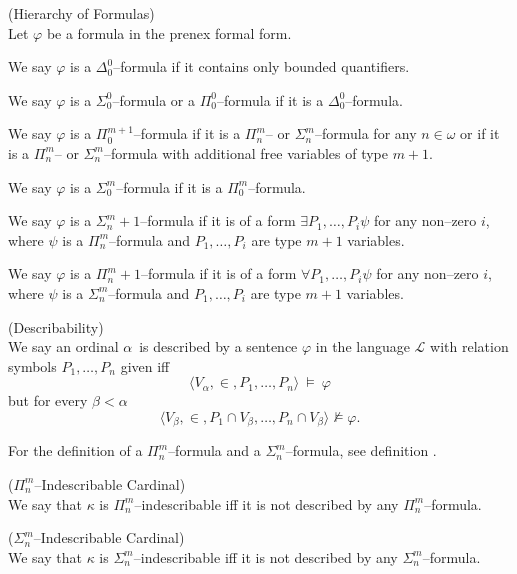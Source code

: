 \begin{definition}{(Hierarchy of Formulas)}\label{def:analytical_hierarchy}\\
Let $\varphi$ be a formula in the prenex formal form.
\bce[(i)]
\item We say $\varphi$ is a $\Delta^0_0$–formula if it contains only bounded quantifiers.
\item We say $\varphi$ is a $\Sigma^0_0$–formula or a $\Pi^0_0$–formula if it is a $\Delta^0_0$–formula.
\item We say $\varphi$ is a $\Pi^{m+1}_0$–formula if it is a $\Pi^m_n$– or $\Sigma^m_n$–formula for any $n \in \omega$ or if it is a $\Pi^m_n$– or $\Sigma^m_n$–formula with additional free variables of type $m+1$.
\item We say $\varphi$ is a $\Sigma^m_0$–formula if it is a $\Pi^m_0$–formula.
\item We say $\varphi$ is a $\Sigma^m_n+1$–formula if it is of a form $\exists P_1, \ldots, P_i \psi$ for any non–zero $i$, where $\psi$ is a $\Pi^m_n$–formula and $P_1, \ldots, P_i$ are type $m+1$ variables.
\item We say $\varphi$ is a $\Pi^m_n+1$–formula if it is of a form $\forall P_1, \ldots, P_i \psi$ for any non–zero $i$, where $\psi$ is a $\Sigma^m_n$–formula and $P_1, \ldots, P_i$ are type $m+1$ variables.
\ece
\end{definition}


\begin{definition}{(Describability)}\label{def:describability}\\
We say an ordinal $\alpha$ is described by a sentence $\varphi$ in the language $\mathscr{L}$ with relation symbols $P_1, \ldots, P_n$ given iff
\begin{equation}
\langle V_\alpha, \in, P_1, \ldots, P_n \rangle~\models~\varphi
\end{equation}
but for every $\beta < \alpha$
\begin{equation}
\langle V_\beta, \in, P_1 \cap V_\beta, \ldots, P_n \cap V_\beta \rangle \not\models \varphi\mbox{.}
\end{equation}
\end{definition}

For the definition of a $\Pi^m_n$–formula and a $\Sigma^m_n$–formula, see definition .

\begin{definition}{($\Pi^m_n$–Indescribable Cardinal)}\label{def:pi_mn_indescribable}\\
We say that $\kappa$ is $\Pi^m_n$–indescribable iff it is not described by any $\Pi^m_n$–formula.
\end{definition}
\begin{definition}{($\Sigma^m_n$–Indescribable Cardinal)}\label{def:sigma_mn_indescribable}\\
We say that $\kappa$ is $\Sigma^m_n$–indescribable iff it is not described by any $\Sigma^m_n$–formula.
\end{definition}

